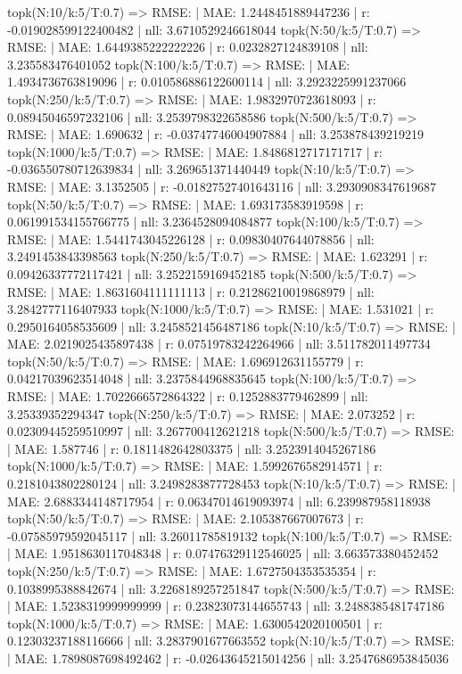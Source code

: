 topk(N:10/k:5/T:0.7) => RMSE: | MAE: 1.2448451889447236 | r: -0.019028599122400482 | nll: 3.6710529246618044
topk(N:50/k:5/T:0.7) => RMSE: | MAE: 1.6449385222222226 | r: 0.0232827124839108 | nll: 3.235583476401052
topk(N:100/k:5/T:0.7) => RMSE: | MAE: 1.4934736763819096 | r: 0.010586886122600114 | nll: 3.2923225991237066
topk(N:250/k:5/T:0.7) => RMSE: | MAE: 1.9832970723618093 | r: 0.08945046597232106 | nll: 3.2539798322658586
topk(N:500/k:5/T:0.7) => RMSE: | MAE: 1.690632 | r: -0.03747746004907884 | nll: 3.253878439219219
topk(N:1000/k:5/T:0.7) => RMSE: | MAE: 1.8486812717171717 | r: -0.036550780712639834 | nll: 3.269651371440449
topk(N:10/k:5/T:0.7) => RMSE: | MAE: 3.1352505 | r: -0.01827527401643116 | nll: 3.2930908347619687
topk(N:50/k:5/T:0.7) => RMSE: | MAE: 1.693173583919598 | r: 0.061991534155766775 | nll: 3.2364528094084877
topk(N:100/k:5/T:0.7) => RMSE: | MAE: 1.5441743045226128 | r: 0.09830407644078856 | nll: 3.2491453843398563
topk(N:250/k:5/T:0.7) => RMSE: | MAE: 1.623291 | r: 0.09426337772117421 | nll: 3.2522159169452185
topk(N:500/k:5/T:0.7) => RMSE: | MAE: 1.8631604111111113 | r: 0.21286210019868979 | nll: 3.2842777116407933
topk(N:1000/k:5/T:0.7) => RMSE: | MAE: 1.531021 | r: 0.2950164058535609 | nll: 3.2458521456487186
topk(N:10/k:5/T:0.7) => RMSE: | MAE: 2.0219025435897438 | r: 0.07519783242264966 | nll: 3.511782011497734
topk(N:50/k:5/T:0.7) => RMSE: | MAE: 1.696912631155779 | r: 0.04217039623514048 | nll: 3.2375844968835645
topk(N:100/k:5/T:0.7) => RMSE: | MAE: 1.7022666572864322 | r: 0.1252883779462899 | nll: 3.25339352294347
topk(N:250/k:5/T:0.7) => RMSE: | MAE: 2.073252 | r: 0.02309445259510997 | nll: 3.267700412621218
topk(N:500/k:5/T:0.7) => RMSE: | MAE: 1.587746 | r: 0.1811482642803375 | nll: 3.2523914045267186
topk(N:1000/k:5/T:0.7) => RMSE: | MAE: 1.5992676582914571 | r: 0.2181043802280124 | nll: 3.2498283877728453
topk(N:10/k:5/T:0.7) => RMSE: | MAE: 2.6883344148717954 | r: 0.06347014619093974 | nll: 6.239987958118938
topk(N:50/k:5/T:0.7) => RMSE: | MAE: 2.105387667007673 | r: -0.07585979592045117 | nll: 3.26011785819132
topk(N:100/k:5/T:0.7) => RMSE: | MAE: 1.9518630117048348 | r: 0.07476329112546025 | nll: 3.663573380452452
topk(N:250/k:5/T:0.7) => RMSE: | MAE: 1.6727504353535354 | r: 0.1038995388842674 | nll: 3.2268189257251847
topk(N:500/k:5/T:0.7) => RMSE: | MAE: 1.5238319999999999 | r: 0.23823073144655743 | nll: 3.2488385481747186
topk(N:1000/k:5/T:0.7) => RMSE: | MAE: 1.6300542020100501 | r: 0.12303237188116666 | nll: 3.2837901677663552
topk(N:10/k:5/T:0.7) => RMSE: | MAE: 1.7898087698492462 | r: -0.02643645215014256 | nll: 3.2547686953845036
